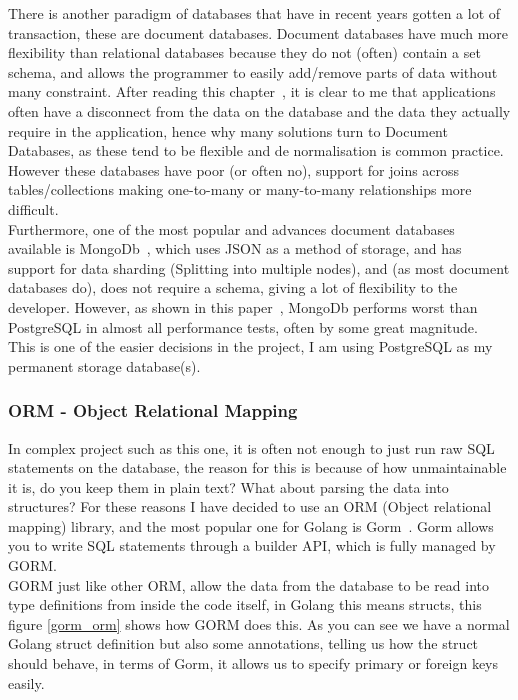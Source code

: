 \documentclass[titlepage]{article}
\begin{document}
There is another paradigm of databases that have in recent years gotten a lot of transaction, these are document databases. Document databases have much more flexibility than relational databases because they do not (often) contain a set schema, and allows the programmer to easily add/remove parts of data without many constraint. After reading this chapter~\cite{relational_vs_document}, it is clear to me that applications often have a disconnect from the data on the database and the data they actually require in the application, hence why many solutions turn to Document Databases, as these tend to be flexible and de normalisation is common practice. However these databases have poor (or often no), support for joins across tables/collections making one-to-many or many-to-many relationships more difficult. \\

Furthermore, one of the most popular and advances document databases available is MongoDb~\cite{mongodb}, which uses JSON as a method of storage, and has support for data sharding (Splitting into multiple nodes), and (as most document databases do), does not require a schema, giving a lot of flexibility to the developer. However, as shown in this paper~\cite{mongo_vs_postgres}, MongoDb performs worst than PostgreSQL in almost all performance tests, often by some great magnitude. \\

This is one of the easier decisions in the project, I am using PostgreSQL as my permanent storage database(s).

\subsubsection{ORM - Object Relational Mapping}
In complex project such as this one, it is often not enough to just run raw SQL statements on the database, the reason for this is because of how unmaintainable it is, do you keep them in plain text? What about parsing the data into structures? For these reasons I have decided to use an ORM (Object relational mapping) library, and the most popular one for Golang is Gorm~\cite{gorm}. Gorm allows you to write SQL statements through a builder API, which is fully managed by GORM. \\

GORM just like other ORM, allow the data from the database to be read into type definitions from inside the code itself, in Golang this means structs, this figure \ref{gorm_orm} shows how GORM does this. As you can see we have a normal Golang struct definition but also some annotations, telling us how the struct should behave, in terms of Gorm, it allows us to specify primary or foreign keys easily.
\end{document}
